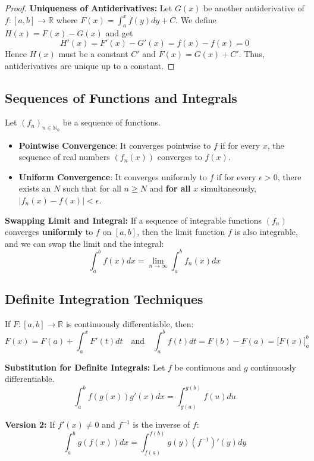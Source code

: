 \begin{proof}
    \textbf{Uniqueness of Antiderivatives:} Let $G(x)$ be another antiderivative of $f: [a,b] \to \mathbb{R}$ where $F(x) = \int_{a}^{x} f(y)dy + C$. We define $H(x) = F(x) - G(x)$ and get
    $$H'(x) = F'(x) - G'(x) = f(x) - f(x) = 0$$ 
    Hence $H(x)$ must be a constant $C'$ and $F(x) = G(x) + C'$. Thus, antiderivatives are unique up to a constant.
\end{proof}

\subsection{Sequences of Functions and Integrals}

\begin{definition}
    Let $(f_n)_{n \in \mathbb{N}_0}$ be a sequence of functions. 
    \begin{itemize}
        \item \textbf{Pointwise Convergence}: It converges pointwise to $f$ if for every $x$, the sequence of real numbers $(f_n(x))$ converges to $f(x)$.
        \item \textbf{Uniform Convergence}: It converges uniformly to $f$ if for every $\epsilon > 0$, there exists an $N$ such that for all $n \ge N$ and \textbf{for all} $x$ simultaneously, $|f_n(x) - f(x)| < \epsilon$.
    \end{itemize}
\end{definition}

\begin{theorem}
    \textbf{Swapping Limit and Integral:} If a sequence of integrable functions $(f_n)$ converges \textbf{uniformly} to $f$ on $[a,b]$, then the limit function $f$ is also integrable, and we can swap the limit and the integral:
    $$\int_a^b f(x)dx = \lim_{n \to \infty} \int_a^b f_n(x) dx$$
\end{theorem}

\subsection{Definite Integration Techniques}

\begin{lemma}
    If $F: [a,b] \to \mathbb{R}$ is continuously differentiable, then:
    $$F(x) = F(a) + \int_{a}^{x} F'(t)dt \quad \text{and} \quad \int_{a}^{b} f(t)dt = F(b) - F(a) = \Big[ F(x) \Big]_a^b$$
\end{lemma}

\begin{lemma}
    \textbf{Substitution for Definite Integrals:} Let $f$ be continuous and $g$ continuously differentiable.
    $$\int_{a}^{b} f(g(x))g'(x)dx  = \int_{g(a)}^{g(b)} f(u) du$$
    
    \textbf{Version 2:} If $f'(x) \neq 0$ and $f^{-1}$ is the inverse of $f$:
    $$\int_a^b g(f(x)) dx = \int_{f(a)}^{f(b)} g(y) (f^{-1})'(y) dy$$
\end{lemma}


